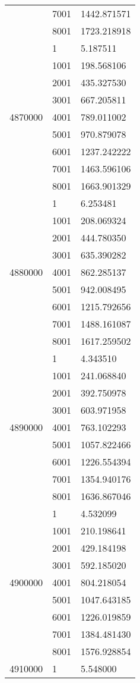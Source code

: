 \begin{table}[htb!]
\begin{tabular}{lll}
 & 7001 & 1442.871571 \\
 & 8001 & 1723.218918 \\
\multirow[c]{9}{*}{4870000} & 1 & 5.187511 \\
 & 1001 & 198.568106 \\
 & 2001 & 435.327530 \\
 & 3001 & 667.205811 \\
 & 4001 & 789.011002 \\
 & 5001 & 970.879078 \\
 & 6001 & 1237.242222 \\
 & 7001 & 1463.596106 \\
 & 8001 & 1663.901329 \\
\multirow[c]{9}{*}{4880000} & 1 & 6.253481 \\
 & 1001 & 208.069324 \\
 & 2001 & 444.780350 \\
 & 3001 & 635.390282 \\
 & 4001 & 862.285137 \\
 & 5001 & 942.008495 \\
 & 6001 & 1215.792656 \\
 & 7001 & 1488.161087 \\
 & 8001 & 1617.259502 \\
\multirow[c]{9}{*}{4890000} & 1 & 4.343510 \\
 & 1001 & 241.068840 \\
 & 2001 & 392.750978 \\
 & 3001 & 603.971958 \\
 & 4001 & 763.102293 \\
 & 5001 & 1057.822466 \\
 & 6001 & 1226.554394 \\
 & 7001 & 1354.940176 \\
 & 8001 & 1636.867046 \\
\multirow[c]{9}{*}{4900000} & 1 & 4.532099 \\
 & 1001 & 210.198641 \\
 & 2001 & 429.184198 \\
 & 3001 & 592.185020 \\
 & 4001 & 804.218054 \\
 & 5001 & 1047.643185 \\
 & 6001 & 1226.019859 \\
 & 7001 & 1384.481430 \\
 & 8001 & 1576.928854 \\
\multirow[c]{9}{*}{4910000} & 1 & 5.548000 \\

\end{tabular}
\end{table}
